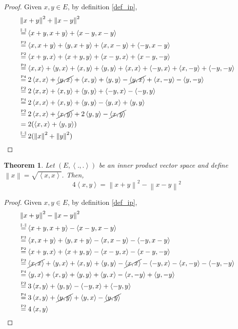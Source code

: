 \documentclass{article}
\newtheorem{theorem}{Theorem}
\newcommand{\norm}[1]{\left\|#1\right\|}
\newcommand{\ip}[2]{\left\langle #1, #2\right\rangle}
\newcommand{\comment}[2]{\stackrel{\mathclap{\textnormal{\tiny\mbox{#2}}}}{#1}}
\begin{document}
\begin{proof}
  Given \(x, y \in E\), by definition \ref{def_ip},
  \begin{align*}
    & \norm{x+y}^2 + \norm{x-y}^2 \\
    & \comment{=}{\(\norm{.}\)} \ip{x+y}{x+y} + \ip{x-y}{x-y} \\
    & \comment{=}{P3} \ip{x}{x+y} + \ip{y}{x+y} + \ip{x}{x-y}
      + \ip{-y}{x-y} \\
    & \comment{=}{P2} \ip{x+y}{x} + \ip{x+y}{y} + \ip{x-y}{x}
      + \ip{x-y}{-y} \\
    & \comment{=}{P3} \ip{x}{x} + \ip{y}{x} + \ip{x}{y} + \ip{y}{y}
      + \ip{x}{x} + \ip{-y}{x} + \ip{x}{-y} + \ip{-y}{-y} \\
    & \comment{=}{P4} 2\ip{x}{x} + \cancel{\ip{y}{x}} + \ip{x}{y} + \ip{y}{y}
      - \cancel{\ip{y}{x}} + \ip{x}{-y} - \ip{y}{-y} \\
    & \comment{=}{P2} 2\ip{x}{x} + \ip{x}{y} + \ip{y}{y} + \ip{-y}{x} -
      \ip{-y}{y} \\
    & \comment{=}{P4} 2\ip{x}{x} + \ip{x}{y} + \ip{y}{y} - \ip{y}{x} +
      \ip{y}{y} \\
    & \comment{=}{P2} 2\ip{x}{x} + \cancel{\ip{x}{y}} + 2\ip{y}{y} -
      \cancel{\ip{x}{y}} \\
    & = 2(\ip{x}{x} + \ip{y}{y}) \\
    & \comment{=}{\(\norm{.}\)} 2(\norm{x}^2 + \norm{y}^2)
  \end{align*}
\end{proof}

\begin{theorem}
  Let \((E,\ip{.}{.})\) be an inner product vector space and define
  \mbox{\(\norm{x} = \sqrt{\ip{x}{x}}\)}.  Then,
  \[4\ip{x}{y} = \norm{x+y}^2 - \norm{x-y}^2\]
\end{theorem}

\begin{proof}
  Given \(x, y \in E\), by definition \ref{def_ip},
  \begin{align*}
    & \norm{x+y}^2 - \norm{x-y}^2 \\
    & \comment{=}{\(\norm{.}\)} \ip{x+y}{x+y} - \ip{x-y}{x-y} \\
    & \comment{=}{P3} \ip{x}{x+y} + \ip{y}{x+y} - \ip{x}{x-y}
      - \ip{-y}{x-y} \\
    & \comment{=}{P2} \ip{x+y}{x} + \ip{x+y}{y} - \ip{x-y}{x}
      - \ip{x-y}{-y} \\
    & \comment{=}{P3} \cancel{\ip{x}{x}} + \ip{y}{x} + \ip{x}{y} + \ip{y}{y}
      - \cancel{\ip{x}{x}} - \ip{-y}{x} - \ip{x}{-y} - \ip{-y}{-y} \\
    & \comment{=}{P4} \ip{y}{x} + \ip{x}{y} + \ip{y}{y}
      + \ip{y}{x} - \ip{x}{-y} + \ip{y}{-y} \\
    & \comment{=}{P2} 3\ip{x}{y} + \ip{y}{y} - \ip{-y}{x} + \ip{-y}{y} \\
    & \comment{=}{P4} 3\ip{x}{y} + \cancel{\ip{y}{y}} + \ip{y}{x} -
      \cancel{\ip{y}{y}} \\
    & \comment{=}{P2} 4\ip{x}{y}
  \end{align*}
\end{proof}
\end{document}
